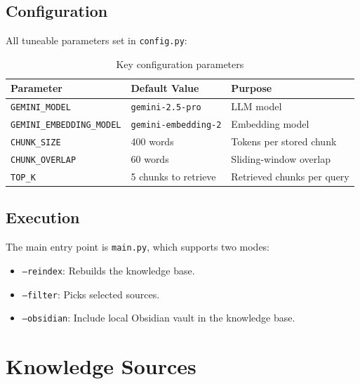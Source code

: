 \documentclass[12pt, a4paper]{report}
\begin{document}
\section{Configuration}

All tuneable parameters set in \texttt{config.py}:
\medskip
\begin{table}[H]
      \centering
      \begin{tabular}{llp{6cm}}
            \toprule
            \textbf{Parameter}                & \textbf{Default Value}      & \textbf{Purpose}           \\
            \midrule
            \texttt{GEMINI\_MODEL}            & \texttt{gemini-2.5-pro}     & LLM model                  \\
            \texttt{GEMINI\_EMBEDDING\_MODEL} & \texttt{gemini-embedding-2} & Embedding model            \\
            \texttt{CHUNK\_SIZE}              & 400 words                   & Tokens per stored chunk    \\
            \texttt{CHUNK\_OVERLAP}           & 60 words                    & Sliding-window overlap     \\
            \texttt{TOP\_K}                   & 5 chunks to retrieve        & Retrieved chunks per query \\
            \bottomrule
      \end{tabular}
      \caption{Key configuration parameters}
\end{table}

\section{Execution}

The main entry point is \texttt{main.py}, which supports two modes:

\begin{itemize}
      \item \texttt{--reindex}: Rebuilds the knowledge base.
      \item \texttt{--filter}: Picks selected sources.
      \item \texttt{--obsidian}: Include local Obsidian vault in the knowledge base.
\end{itemize}

\chapter{Knowledge Sources}
\end{document}
